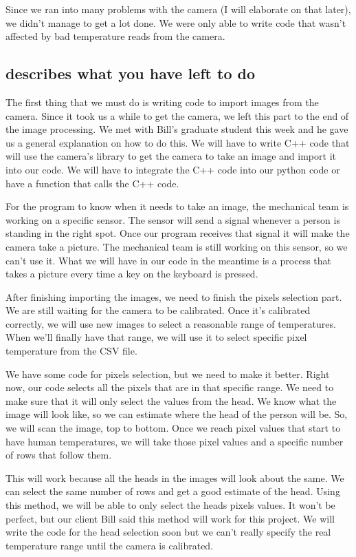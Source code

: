 \documentclass[onecolumn, draftclsnofoot,10pt, compsoc]{IEEEtran}
\begin{document}
Since we ran into many problems with the camera (I will elaborate on that later), we didn’t manage to get a lot done. We were only able to write code that wasn’t affected by bad temperature reads from the camera. 

\subsection{describes what you have left to do}

The first thing that we must do is writing code to import images from the camera. Since it took us a while to get the camera, we left this part to the end of the image processing. We met with Bill’s graduate student this week and he gave us a general explanation on how to do this. We will have to write C++ code that will use the camera’s library to get the camera to take an image and import it into our code. We will have to integrate the C++ code into our python code or have a function that calls the C++ code. 

For the program to know when it needs to take an image, the mechanical team is working on a specific sensor. The sensor will send a signal whenever a person is standing in the right spot. Once our program receives that signal it will make the camera take a picture. The mechanical team is still working on this sensor, so we can’t use it. What we will have in our code in the meantime is a process that takes a picture every time a key on the keyboard is pressed. 

After finishing importing the images, we need to finish the pixels selection part. We are still waiting for the camera to be calibrated. Once it’s calibrated correctly, we will use new images to select a reasonable range of temperatures. When we’ll finally have that range, we will use it to select specific pixel temperature from the CSV file. 

We have some code for pixels selection, but we need to make it better.  Right now, our code selects all the pixels that are in that specific range. We need to make sure that it will only select the values from the head. We know what the image will look like, so we can estimate where the head of the person will be. So, we will scan the image, top to bottom.  Once we reach pixel values that start to have human temperatures, we will take those pixel values and a specific number of rows that follow them. 

This will work because all the heads in the images will look about the same. We can select the same number of rows and get a good estimate of the head.  Using this method, we will be able to only select the heads pixels values. It won’t be perfect, but our client Bill said this method will work for this project. We will write the code for the head selection soon but we can’t really specify the real temperature range until the camera is calibrated. 
\end{document}
